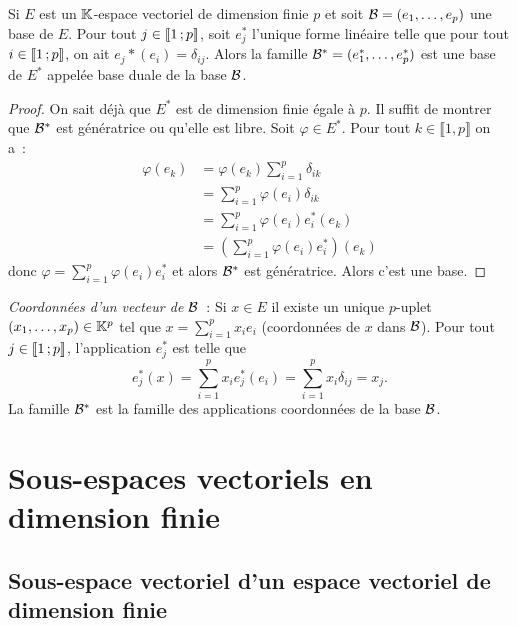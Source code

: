 \begin{prop}
  Si \(E\) est un \(\mathbb{K}\)-espace vectoriel de dimension finie \(p\) et soit \(\mathcal{B}=(e_1, \ldots, e_p)\) une base de \(E\). Pour tout \(j \in  \mathopen{\llbracket}1\mathclose{}\mathpunct{};p\mathclose{\rrbracket}\), soit \(e_j^*\) l'unique forme linéaire telle que pour tout \(i \in  \mathopen{\llbracket}1\mathclose{}\mathpunct{};p\mathclose{\rrbracket}\), on ait \(e_j*(e_i)=\delta_{ij}\). Alors la famille \(\mathcal{B}^* = (e_1^*, \ldots, e_p^*)\) est une base de \(E^*\) appelée base duale de la base \(\mathcal{B}\).
\end{prop}
\begin{proof}
  On sait déjà que \(E^*\) est de dimension finie égale à \(p\). Il suffit de montrer que \(\mathcal{B}^*\) est génératrice ou qu'elle est libre. Soit \(\varphi \in E^*\). Pour tout \(k \in \llbracket 1,p \rrbracket\) on a~:
  \begin{align}
    \varphi(e_k)&= \varphi(e_k) \sum_{i=1}^p \delta_{ik} \\
                &= \sum_{i=1}^p \varphi(e_i) \delta_{ik} \\ 
                &=\sum_{i=1}^p \varphi(e_i) e_i^*(e_k)  \\
                &=\left(\sum_{i=1}^p \varphi(e_i) e_i^* \right)(e_k)
  \end{align}
  donc \(\varphi = \sum_{i=1}^p \varphi(e_i) e_i^*\) et alors \(\mathcal{B}^*\) est génératrice. Alors c'est une base.
\end{proof}

\emph{Coordonnées d'un vecteur de \(\mathcal{B}\)}~: Si \(x \in E\) il existe un unique \(p\)-uplet \((x_1, \ldots, x_p) \in \mathbb{K}^p\) tel que \(x = \sum_{i=1}^p x_i e_i\) (coordonnées de \(x\) dans \(\mathcal{B}\)). Pour tout \(j \in  \mathopen{\llbracket}1\mathclose{}\mathpunct{};p\mathclose{\rrbracket}\), l'application \(e_j^*\) est telle que
\begin{equation}
  e_j^*(x)=\sum_{i=1}^p x_i e_j^*(e_i) = \sum_{i=1}^p x_i \delta_{ij} = x_j.
\end{equation}
La famille \(\mathcal{B}^*\) est la famille des applications coordonnées de la base \(\mathcal{B}\).

\section{Sous-espaces vectoriels en dimension finie}

\subsection{Sous-espace vectoriel d'un espace vectoriel de dimension finie}

